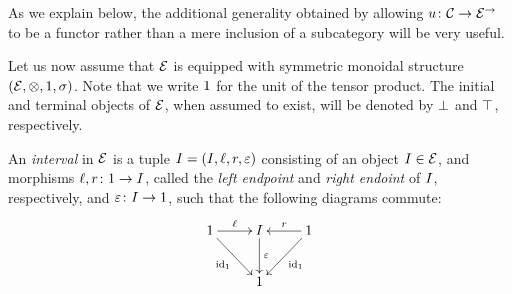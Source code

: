 \documentclass[reqno,10pt,a4paper,oneside]{amsart}
\begin{document}
As we explain below, the additional generality obtained by allowing $u \colon \mathcal{C} \to \mathcal{E}^\to$ to be a functor rather than a mere inclusion of a  subcategory will be very useful. 

\medskip



Let us now assume that $\mathcal{E}$ is equipped with symmetric monoidal structure $(\mathcal{E}, \otimes, 1, \sigma)$.
Note that we write $1$ for the unit of the tensor product. The initial and terminal objects of $\mathcal{E}$, when assumed to exist, will be denoted by $\bot$ and $\top$, respectively.

\begin{definition} An \emph{interval} in $\mathcal{E}$ is a tuple $I = (I, \ell, r, \varepsilon)$ consisting of  an object $I \in \mathcal{E}$, 
and morphisms $\ell, r \colon 1 \to I$, called the \emph{left endpoint} and
\emph{right endoint} of $I$, respectively, 
 and $\varepsilon \colon I \to 1$,   such that the following diagrams commute:
\[
\xymatrix{
\unit \ar[r]^\intervall \ar[dr]_{\id_\unit} & \interval \ar[d]^-{\varepsilon} & \unit \ar[dl]^{\id_\unit} \ar[l]_{\intervalr}  \\
 & \unit & }
 \]
\end{definition}
\end{document}
